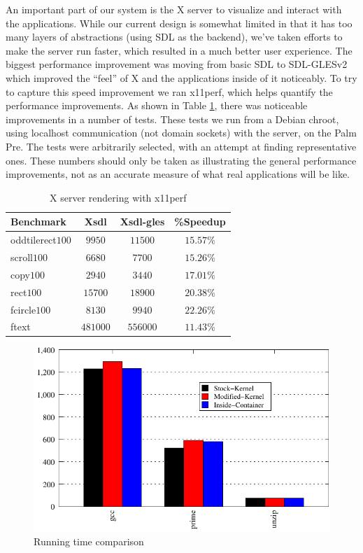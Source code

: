 An important part of our system is the X server to visualize and interact with the applications.  While our current design is somewhat limited in that it has too many layers of abstractions (using SDL as the backend), we've taken efforts to make the server run faster, which resulted in a much better user experience.  The biggest  performance improvement was moving from basic SDL to SDL-GLESv2 which improved the ``feel'' of X and the applications inside of it noticeably.  To try to capture this speed improvement we ran x11perf, which helps quantify the performance improvements.  As shown in Table \ref{tab:x_results}, there was noticeable improvements in a number of tests.
These tests we run from a Debian chroot, using localhost communication (not domain sockets) with the server, on the Palm Pre.  The tests were arbitrarily selected, with an attempt at finding representative ones.  These numbers should only be taken as illustrating the general performance improvements, not as an accurate measure of what real applications will be like.

\begin{table}[ht]
{\small
\hfill{}
\begin{tabular}{|l|c|c|c|}
\hline Benchmark & Xsdl & Xsdl-gles & \%Speedup \\ [2pt] 
\hline oddtilerect$100$ & $9950$ & $11500$ & $15.57\%$ \\ [2pt]
scroll$100$ & $6680$ & $7700$ & $15.26\%$ \\ [2pt]
copy$100$ & $2940$ & $3440$ & $17.01\%$ \\ [2pt]
rect$100$ & $15700$ & $18900$ & $20.38\%$ \\ [2pt]
fcircle$100$ & $8130$ & $9940$ & $22.26\%$ \\ [2pt]
ftext & $481000$ & $556000$ & $11.43\%$ \\ [2pt]
\hline 
\end{tabular}}
\hfill{}
\caption{ X server rendering with x11perf }
\label{tab:x_results}
\end{table}

\begin{figure}[tbh]
\centering
\includegraphics[width=1.0\columnwidth]{perf}
\caption{Running time comparison}
\label{fig:perf}
\end{figure}


